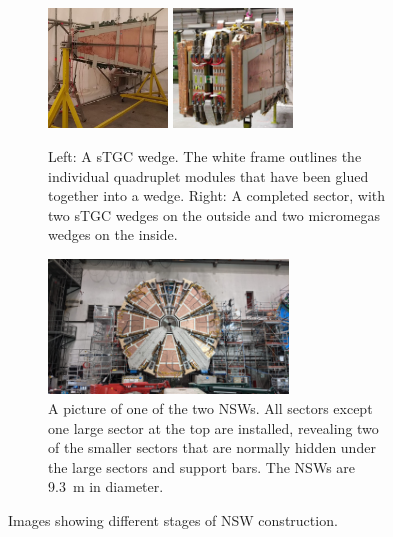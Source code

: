 \begin{figure}
\begin{subfigure}{\textwidth}
  \centering
  \includegraphics[width=0.35\textwidth]{figures/stgc_wedge.jpg}
  \includegraphics[width=0.35\textwidth]{figures/sector.jpg}
  \caption{Left: A sTGC wedge. The white frame outlines the individual quadruplet modules that have been glued together into a wedge. Right: A completed sector, with two sTGC wedges on the outside and two micromegas wedges on the inside.}
  \label{fig:wedge_and_sector}
\end{subfigure}

\smallskip

\begin{subfigure}{\textwidth}
  \centering
  \includegraphics[width=0.7\textwidth]{figures/nsw_2021-05-27_landscape.jpeg}
  \caption{A picture of one of the two NSWs. All sectors except one large sector at the top are installed, revealing two of the smaller sectors that are normally hidden under the large sectors and support bars. The NSWs are \SI{9.3}{m} in diameter. }
  \label{fig:nsw}
  \end{subfigure}
\caption{Images showing different stages of NSW construction.}
\label{fig:nsw_breakdown}
\end{figure}
\newpage
\restoregeometry

